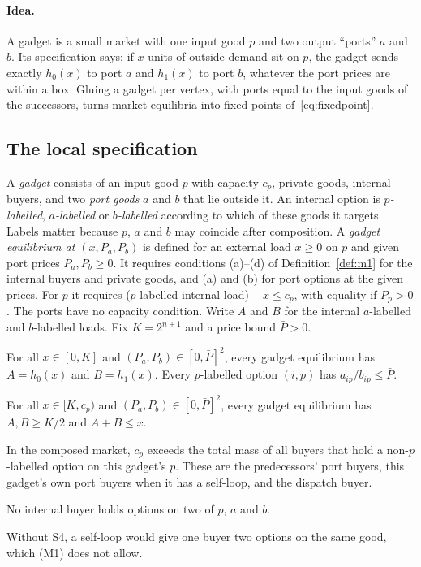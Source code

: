 \paragraph{Idea.} A gadget is a small market with one input good $p$ and two output ``ports'' $a$ and
$b$. Its specification says: if $x$ units of outside demand sit on $p$, the gadget sends exactly
$h_0(x)$ to port $a$ and $h_1(x)$ to port $b$, whatever the port prices are within a box. Gluing a gadget
per vertex, with ports equal to the input goods of the successors, turns market equilibria into fixed
points of~\eqref{eq:fixedpoint}.

\subsection{The local specification}

A \emph{gadget} consists of an input good $p$ with capacity $c_p$, private goods, internal buyers, and two
\emph{port goods} $a$ and $b$ that lie outside it. An internal option is \emph{$p$-labelled},
\emph{$a$-labelled} or \emph{$b$-labelled} according to which of these goods it targets. Labels matter
because $p$, $a$ and $b$ may coincide after composition. A \emph{gadget equilibrium at $(x,P_a,P_b)$} is
defined for an external load $x\ge0$ on $p$ and given port prices $P_a,P_b\ge0$. It requires conditions
(a)--(d) of Definition~\ref{def:m1} for the internal buyers and private goods, and (a) and (b) for port
options at the given prices. For $p$ it requires ($p$-labelled internal load)${}+x\le c_p$, with
equality if $P_p>0$. The ports have no capacity condition. Write $A$ and $B$ for the internal
$a$-labelled and $b$-labelled loads. Fix $K=2^{n+1}$ and a price bound $\bar P>0$.

\begin{description}[leftmargin=2.5em,style=nextline]
\item[S1.] For all $x\in[0,K]$ and $(P_a,P_b)\in[0,\bar P]^2$, every gadget equilibrium has $A=h_0(x)$
and $B=h_1(x)$. Every $p$-labelled option $(i,p)$ has $a_{ip}/b_{ip}\le\bar P$.
\item[S2.] For all $x\in[K,c_p)$ and $(P_a,P_b)\in[0,\bar P]^2$, every gadget equilibrium has
$A,B\ge K/2$ and $A+B\le x$.
\item[S3.] In the composed market, $c_p$ exceeds the total mass of all buyers that hold a
non-$p$-labelled option on this gadget's $p$. These are the predecessors' port buyers, this gadget's own
port buyers when it has a self-loop, and the dispatch buyer.
\item[S4.] No internal buyer holds options on two of $p$, $a$ and $b$.
\end{description}
Without S4, a self-loop would give one buyer two options on the same good, which (M1) does not allow.

